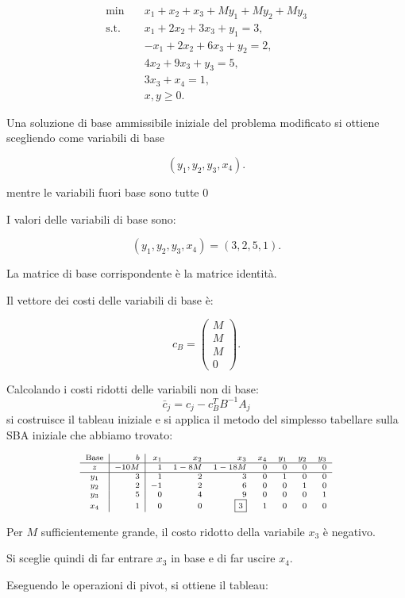 \[
\begin{aligned}
\min \quad &
x_1+x_2+x_3+My_1+My_2+My_3\\
\text{s.t.}\quad
&x_1+2x_2+3x_3+y_1=3,\\
&-x_1+2x_2+6x_3+y_2=2,\\
&4x_2+9x_3+y_3=5,\\
&3x_3+x_4=1,\\
&x,y\geq 0.
\end{aligned}
\]

Una soluzione di base ammissibile iniziale
del problema modificato si ottiene scegliendo
come variabili di base

\[
(y_1,y_2,y_3,x_4).
\]

mentre le variabili fuori base sono tutte 0

I valori delle variabili di base  sono:

\[
(y_1,y_2,y_3,x_4)=(3,2,5,1).
\]

La matrice di base corrispondente è la matrice identità.

Il vettore dei costi delle variabili di base è:

\[
c_B=
\begin{pmatrix}
M\\M\\M\\0
\end{pmatrix}.
\]

Calcolando i costi ridotti delle variabili non di base:
\[
\boxed{\bar c_j=c_j-c_B^TB^{-1}A_j}
\]
si costruisce il tableau iniziale e si applica il metodo del simplesso tabellare sulla SBA iniziale che abbiamo trovato:

\[
\scriptsize
\begin{array}{c|r|rrrrrrr}
\text{Base}&b&
x_1&x_2&x_3&x_4&y_1&y_2&y_3\\
\hline
z&-10M&
1&1-8M&1-18M&0&0&0&0\\
\hline
y_1&3&1&2&3&0&1&0&0\\
y_2&2&-1&2&6&0&0&1&0\\
y_3&5&0&4&9&0&0&0&1\\
x_4&1&0&0&\boxed{3}&1&0&0&0
\end{array}
\]

Per $M$ sufficientemente grande,
il costo ridotto della variabile $x_3$ è negativo.

Si sceglie quindi di far entrare $x_3$ in base
e di far uscire $x_4$.

Eseguendo le operazioni di pivot,
si ottiene il tableau:

